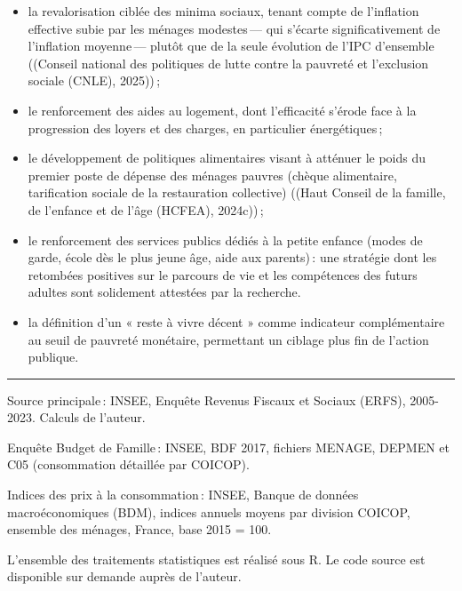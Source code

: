 \documentclass[
  french,
  9pt,
  a4paper,
]{article}
\providecommand{\tightlist}{%
  \setlength{\itemsep}{0pt}\setlength{\parskip}{0pt}}
\begin{document}
\begin{itemize}
\tightlist
\item
  la revalorisation ciblée des minima sociaux, tenant compte de
  l'inflation effective subie par les ménages modestes\,--- qui s'écarte
  significativement de l'inflation moyenne\,--- plutôt que de la seule
  évolution de l'IPC d'ensemble ((Conseil national des politiques de
  lutte contre la pauvreté et l'exclusion sociale (CNLE), 2025))\,;
\item
  le renforcement des aides au logement, dont l'efficacité s'érode face
  à la progression des loyers et des charges, en particulier
  énergétiques\,;
\item
  le développement de politiques alimentaires visant à atténuer le poids
  du premier poste de dépense des ménages pauvres (chèque alimentaire,
  tarification sociale de la restauration collective) ((Haut Conseil de
  la famille, de l'enfance et de l'âge (HCFEA), 2024c))\,;
\item
  le renforcement des services publics dédiés à la petite enfance (modes
  de garde, école dès le plus jeune âge, aide aux parents)\,: une
  stratégie dont les retombées positives sur le parcours de vie et les
  compétences des futurs adultes sont solidement attestées par la
  recherche.
\item
  la définition d'un « reste à vivre décent » comme indicateur
  complémentaire au seuil de pauvreté monétaire, permettant un ciblage
  plus fin de l'action publique.
\end{itemize}

\begin{center}\rule{0.5\linewidth}{0.5pt}\end{center}

\begin{tcolorbox}[enhanced jigsaw, leftrule=.75mm, breakable, toptitle=1mm, toprule=.15mm, title={Données et sources}, opacityback=0, arc=.35mm, opacitybacktitle=0.6, colback=white, coltitle=black, colframe=quarto-callout-note-color-frame, left=2mm, colbacktitle=quarto-callout-note-color!10!white, bottomtitle=1mm, titlerule=0mm, rightrule=.15mm, bottomrule=.15mm]

Source principale\,: INSEE, Enquête Revenus Fiscaux et Sociaux (ERFS),
2005-2023. Calculs de l'auteur.

Enquête Budget de Famille\,: INSEE, BDF 2017, fichiers MENAGE, DEPMEN et
C05 (consommation détaillée par COICOP).

Indices des prix à la consommation\,: INSEE, Banque de données
macroéconomiques (BDM), indices annuels moyens par division COICOP,
ensemble des ménages, France, base 2015 = 100.

L'ensemble des traitements statistiques est réalisé sous R. Le code
source est disponible sur demande auprès de l'auteur.

\end{tcolorbox}
\end{document}
